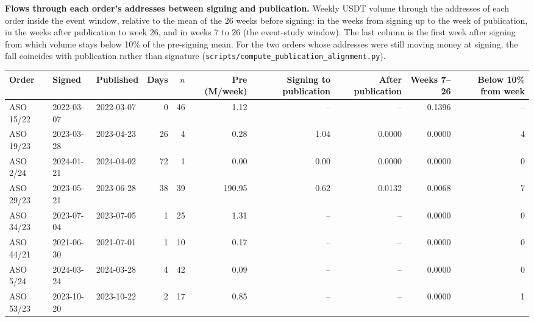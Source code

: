 \caption{\textbf{Flows through each order's addresses between signing and publication.} Weekly USDT volume through the addresses of each order inside the event window, relative to the mean of the 26 weeks before signing: in the weeks from signing up to the week of publication, in the weeks after publication to week 26, and in weeks 7 to 26 (the event-study window). The last column is the first week after signing from which volume stays below 10\% of the pre-signing mean. For the two orders whose addresses were still moving money at signing, the fall coincides with publication rather than signature (\texttt{scripts/compute\_publication\_alignment.py}).}
\label{tab:publication}
\begin{tabular}{lllrrrrrrr}
\toprule
\textbf{Order} & \textbf{Signed} & \textbf{Published} & \textbf{Days} & $n$ & \textbf{Pre (M/week)} & \textbf{Signing to publication} & \textbf{After publication} & \textbf{Weeks 7--26} & \textbf{Below 10\% from week} \\
\midrule
ASO 15/22 & 2022-03-07 & 2022-03-07 & 0 & 46 & 1.12 & -- & -- & 0.1396 & -- \\
ASO 19/23 & 2023-03-28 & 2023-04-23 & 26 & 4 & 0.28 & 1.04 & 0.0000 & 0.0000 & 4 \\
ASO 2/24 & 2024-01-21 & 2024-04-02 & 72 & 1 & 0.00 & 0.00 & 0.0000 & 0.0000 & 0 \\
ASO 29/23 & 2023-05-21 & 2023-06-28 & 38 & 39 & 190.95 & 0.62 & 0.0132 & 0.0068 & 7 \\
ASO 34/23 & 2023-07-04 & 2023-07-05 & 1 & 25 & 1.31 & -- & -- & 0.0000 & 0 \\
ASO 44/21 & 2021-06-30 & 2021-07-01 & 1 & 10 & 0.17 & -- & -- & 0.0000 & 0 \\
ASO 5/24 & 2024-03-24 & 2024-03-28 & 4 & 42 & 0.09 & -- & -- & 0.0000 & 0 \\
ASO 53/23 & 2023-10-20 & 2023-10-22 & 2 & 17 & 0.85 & -- & -- & 0.0000 & 1 \\
\bottomrule
\end{tabular}
